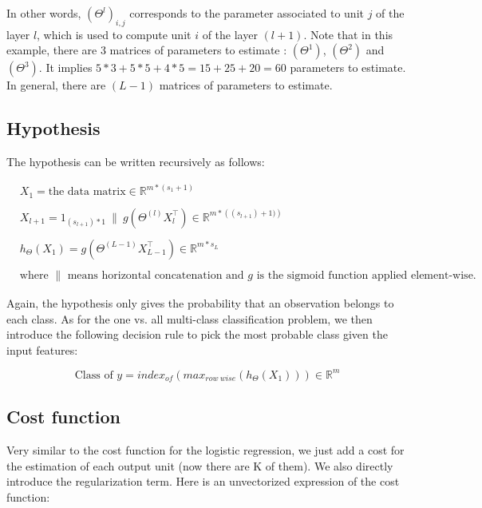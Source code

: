 \documentclass[a4paper, 12pt]{article}
\begin{document}
In other words, ${\left(\Theta^{l}\right)}_{i, j}$ corresponds to the parameter associated to unit $j$ of the layer $l$, which is used to compute unit $i$ of the layer $(l+1)$. Note that in this example, there are 3 matrices of parameters to estimate : $\left(\Theta^{1}\right)$, $\left(\Theta^{2}\right)$ and $\left(\Theta^{3}\right)$. It implies $5*3 + 5*5 + 4*5 = 15 + 25 + 20 = 60$ parameters to estimate. In general, there are $(L-1)$ matrices of parameters to estimate. 

\subsection{Hypothesis}

The hypothesis can be written recursively as follows:

\begin{align*}
& X_1 = \text{the data matrix} \in \mathbb{R}^{m * (s_1+1)} \\
& \\
& X_{l+1} = 1_{(s_{l+1})*1} \: \| \: g(\Theta^{(l)}X_{l}^{\top})  \in \mathbb{R}^{m * \left((s_{l+1})+1)\right)} \\
& \\
& h_{\Theta}(X_{1}) = g(\Theta^{(L-1)}X_{L-1}^{\top})  \in \mathbb{R}^{m * s_{L}} \\
& \\
& \text{where } \| \text{ means horizontal concatenation and } g \text{ is the sigmoid function applied element-wise}.
\end{align*}

Again, the hypothesis only gives the probability that an observation belongs to each class. As for the one vs. all multi-class classification problem, we then introduce the following decision rule to pick the most probable class given the input features:

\begin{equation}
\text{Class of } y = index_{of}\left( max_{row \: wise}(h_{\Theta}(X_{1})) \right) \in \mathbb{R}^{m}
\end{equation}

\subsection{Cost function}

Very similar to the cost function for the logistic regression, we just add a cost for the estimation of each output unit (now there are K of them). We also directly introduce the regularization term. Here is an unvectorized expression of the cost function:
\end{document}
